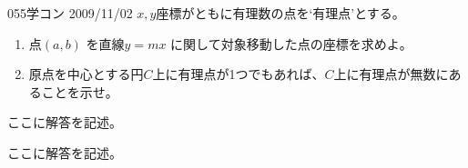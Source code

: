 \begin{prob}{055}{}{学コン 2009/11/02}
 $x,y$座標がともに有理数の点を`有理点'とする。
 \begin{enumerate}
  \item 点$(a,b)$ を直線$y=mx$ に関して対象移動した点の座標を求めよ。
  \item 原点を中心とする円$C$上に有理点が1つでもあれば、$C$上に有理点が無数にあることを示せ。
 \end{enumerate}
\end{prob}
ここに解答を記述。

ここに解答を記述。